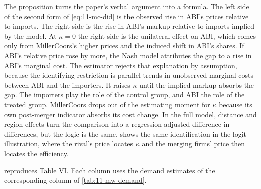 The proposition turns the paper's verbal argument into a formula. The left side of the second form of
\eqref{eq:11-mc-did} is the observed rise in ABI's prices relative to imports. The right side is the rise in ABI's
markup relative to imports implied by the model. At $\kappa = 0$ the right side is the unilateral effect on ABI,
which comes only from MillerCoors's higher prices and the induced shift in ABI's shares. If ABI's relative price rose
by more, the Nash model attributes the gap to a rise in ABI's marginal cost. The estimator rejects that explanation by
assumption, because the identifying restriction is parallel trends in unobserved marginal costs between ABI and the
importers. It raises $\kappa$ until the implied markup absorbs the gap. The importers play the role of the control
group, and ABI the role of the treated group. MillerCoors drops out of the estimating moment for $\kappa$ because its
own post-merger indicator absorbs its cost change. In the full model, distance and region effects turn the comparison
into a regression-adjusted difference in differences, but the logic is the same.  shows the same
identification in the logit illustration, where the rival's price locates $\kappa$ and the merging firms' price then
locates the efficiency.

 reproduces Table VI. Each column uses the demand estimates of the corresponding column of
\cref{tab:11-mw-demand}.

